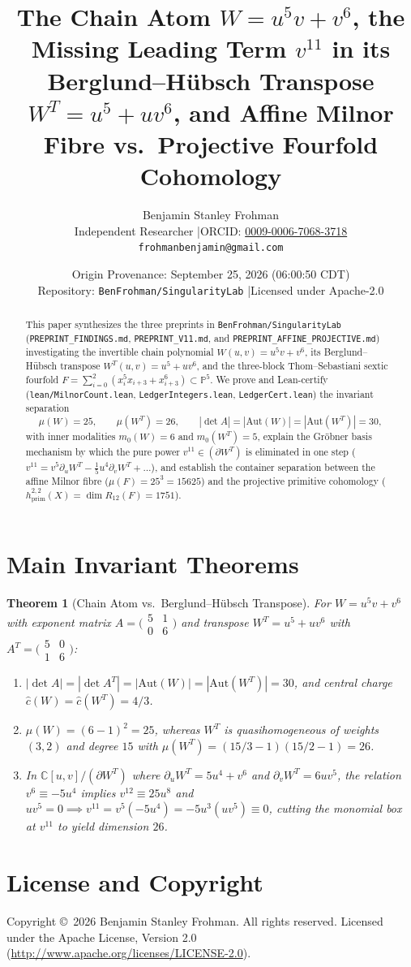 \documentclass[11pt]{article}
\title{\textbf{The Chain Atom $W=u^5v+v^6$, the Missing Leading Term $v^{11}$ in its Berglund--H\"ubsch Transpose $W^T=u^5+uv^6$, and Affine Milnor Fibre vs.\ Projective Fourfold Cohomology}}
\author{Benjamin Stanley Frohman\\
\small Independent Researcher \quad|\quad ORCID: \href{https://orcid.org/0009-0006-7068-3718}{0009-0006-7068-3718}\\
\small \texttt{frohmanbenjamin@gmail.com}}
\date{Origin Provenance: September 25, 2026 (06:00:50 CDT) \\ \small Repository: \texttt{BenFrohman/SingularityLab} \quad|\quad Licensed under Apache-2.0}
\newtheorem{theorem}{Theorem}
\begin{document}
\maketitle

\begin{abstract}
This paper synthesizes the three preprints in \texttt{BenFrohman/SingularityLab} (\texttt{PREPRINT\_FINDINGS.md}, \texttt{PREPRINT\_V11.md}, and \texttt{PREPRINT\_AFFINE\_PROJECTIVE.md}) investigating the invertible chain polynomial $W(u,v) = u^5v + v^6$, its Berglund--H\"ubsch transpose $W^T(u,v) = u^5 + uv^6$, and the three-block Thom--Sebastiani sextic fourfold $F = \sum_{i=0}^2 (x_i^5 x_{i+3} + x_{i+3}^6) \subset \mathbb{P}^5$. We prove and Lean-certify (\texttt{lean/MilnorCount.lean}, \texttt{LedgerIntegers.lean}, \texttt{LedgerCert.lean}) the invariant separation
\[
\mu(W) = 25, \qquad \mu(W^T) = 26, \qquad |\det A| = |\mathrm{Aut}(W)| = |\mathrm{Aut}(W^T)| = 30,
\]
with inner modalities $m_0(W)=6$ and $m_0(W^T)=5$, explain the Gr\"obner basis mechanism by which the pure power $v^{11} \in (\partial W^T)$ is eliminated in one step ($v^{11} = v^5 \partial_u W^T - \tfrac{1}{5}u^4\partial_v W^T + \dots$), and establish the container separation between the affine Milnor fibre ($\mu(F) = 25^3 = 15625$) and the projective primitive cohomology ($h^{2,2}_{\mathrm{prim}}(X) = \dim R_{12}(F) = 1751$).
\end{abstract}

\section{Main Invariant Theorems}
\begin{theorem}[Chain Atom vs.\ Berglund--H\"ubsch Transpose]
For $W = u^5v + v^6$ with exponent matrix $A = \bigl(\begin{smallmatrix}5 & 1\\ 0 & 6\end{smallmatrix}\bigr)$ and transpose $W^T = u^5 + uv^6$ with $A^T = \bigl(\begin{smallmatrix}5 & 0\\ 1 & 6\end{smallmatrix}\bigr)$:
\begin{enumerate}
  \item $|\det A| = |\det A^T| = |\mathrm{Aut}(W)| = |\mathrm{Aut}(W^T)| = 30$, and central charge $\hat{c}(W) = \hat{c}(W^T) = 4/3$.
  \item $\mu(W) = (6-1)^2 = 25$, whereas $W^T$ is quasihomogeneous of weights $(3,2)$ and degree $15$ with $\mu(W^T) = (15/3 - 1)(15/2 - 1) = 26$.
  \item In $\mathbb{C}[u,v]/(\partial W^T)$ where $\partial_u W^T = 5u^4 + v^6$ and $\partial_v W^T = 6uv^5$, the relation $v^6 \equiv -5u^4$ implies $v^{12} \equiv 25u^8$ and $u v^5 = 0 \implies v^{11} = v^5(-5u^4) = -5u^3(uv^5) \equiv 0$, cutting the monomial box at $v^{11}$ to yield dimension $26$.
\end{enumerate}
\end{theorem}

\section*{License and Copyright}
Copyright \copyright\ 2026 Benjamin Stanley Frohman. All rights reserved. Licensed under the Apache License, Version 2.0 (\url{http://www.apache.org/licenses/LICENSE-2.0}).
\end{document}
